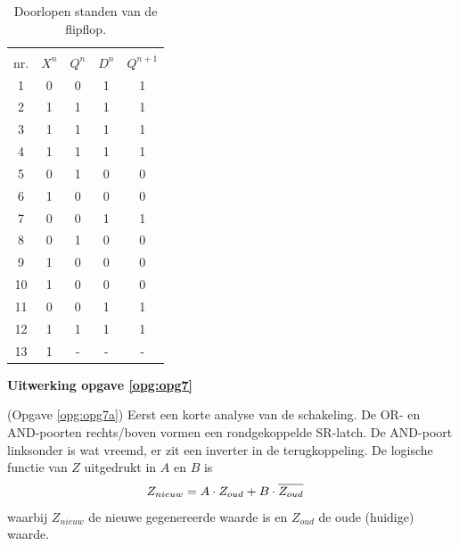 \documentclass[a4paper,12pt,addpoints,fleqn,dutch]{tisdexam}
\newcommand*{\oline}[1]{\overline{#1\mathstrut}}
\begin{document}
\begin{questions}
\begin{table}[H]
  \caption{Doorlopen standen van de flipflop.}
  \label{tab:ant_opg6}
  \begin{tabular}{ c | c c | c c }
    \hline
         &         &         &         &            \\ [-2.9ex]
     nr. & $X^{n}$ & $Q^{n}$ & $D^{n}$ & $Q^{n+1}$  \\ \hline
      1  &    0    &    0    &    1    &    1       \\
      2  &    1    &    1    &    1    &    1       \\
      3  &    1    &    1    &    1    &    1       \\
      4  &    1    &    1    &    1    &    1       \\
      5  &    0    &    1    &    0    &    0       \\
      6  &    1    &    0    &    0    &    0       \\
      7  &    0    &    0    &    1    &    1       \\ 
      8  &    0    &    1    &    0    &    0       \\
      9  &    1    &    0    &    0    &    0       \\
     10  &    1    &    0    &    0    &    0       \\
     11  &    0    &    0    &    1    &    1       \\
     12  &    1    &    1    &    1    &    1       \\
     13  &    1    &    -    &    -    &    -       \\ \hline
  \end{tabular}
\end{table}

\vspace{1em}

\textbf{Uitwerking opgave \ref{opg:opg7}}

(Opgave \ref{opg:opg7a}) Eerst een korte analyse van de schakeling. De OR- en
AND-poorten rechts/boven vormen een rondgekoppelde SR-latch. De AND-poort
linksonder is wat vreemd, er zit een inverter in de terugkoppeling. De
logische functie van $Z$ uitgedrukt in $A$ en $B$ is
\begin{equation*}
\begin{split}
Z_{nieuw} &= A \cdot Z_{oud} + B \cdot \oline{Z_{oud}}
\end{split}
\end{equation*}
waarbij $Z_{nieuw}$ de nieuwe gegenereerde waarde is en $Z_{oud}$ de oude
(huidige) waarde.


\end{questions}
\end{document}

